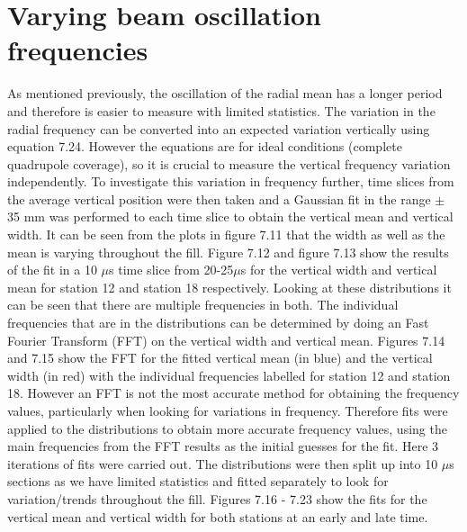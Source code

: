 \section{Varying beam oscillation frequencies}

As mentioned previously, the oscillation of the radial mean has a longer period and therefore is easier to measure with limited statistics. The variation in the radial frequency can be converted into an expected variation vertically using equation 7.24. However the equations are for ideal conditions (complete quadrupole coverage), so it is crucial to measure the vertical frequency variation independently. To investigate this variation in frequency further, time slices from the average vertical position were then taken and a Gaussian fit in the range $\pm$ 35 mm was performed to each time slice to obtain the vertical mean and vertical width. It can be seen from the plots in figure 7.11 that the width as well as the mean is varying throughout the fill. Figure 7.12 and figure 7.13 show the results of the fit in a 10 $\mu$s time slice from 20-25$\mu$s for the vertical width and vertical mean for station 12 and station 18 respectively. Looking at these distributions it can be seen that there are multiple frequencies in both. The individual frequencies that are in the distributions can be determined by doing an Fast Fourier Transform (FFT) on the vertical width and vertical mean. Figures 7.14 and 7.15 show the FFT for the fitted vertical mean (in blue) and the vertical width (in red) with the individual frequencies labelled for station 12 and station 18. However an FFT is not the most accurate method for obtaining the frequency values, particularly when looking for variations in frequency. Therefore fits were applied to the distributions to obtain more accurate frequency values, using the main frequencies from the FFT results as the initial guesses for the fit. Here 3 iterations of fits were carried out. The distributions were then split up into 10 $\mu$s sections 
as we have limited statistics and fitted separately to look for variation/trends throughout the fill. Figures 7.16 - 7.23 show the fits for the vertical mean and vertical width for both stations at an early and late time. 

